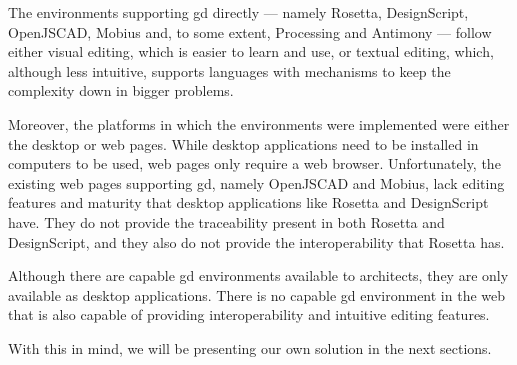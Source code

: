 The environments supporting \gls{gd} directly --- namely Rosetta, DesignScript, OpenJSCAD, Mobius and, to some extent, Processing and Antimony --- follow either visual editing, which is easier to learn and use, or textual editing, which, although less intuitive, supports languages with mechanisms to keep the complexity down in bigger problems.

Moreover, the platforms in which the environments were implemented were either the desktop or web pages.
While desktop applications need to be installed in computers to be used, web pages only require a web browser.
Unfortunately, the existing web pages supporting \gls{gd}, namely OpenJSCAD and Mobius, lack editing features and maturity that desktop applications like Rosetta and DesignScript have.
They do not provide the traceability present in both Rosetta and DesignScript, and they also do not provide the interoperability that Rosetta has.

Although there are capable \gls{gd} environments available to architects, they are only available as desktop applications.
There is no capable \gls{gd} environment in the web that is also capable of providing interoperability and intuitive editing features.

With this in mind, we will be presenting our own solution in the next sections.
